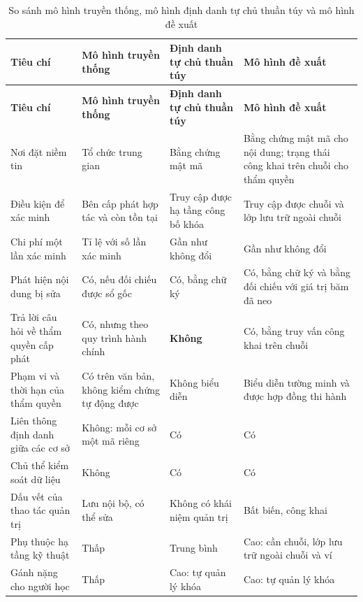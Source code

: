 \begin{longtable}{|p{3.1cm}|p{3.5cm}|p{3.5cm}|p{3.5cm}|}
\caption{So sánh mô hình truyền thống, mô hình định danh tự chủ thuần túy và mô hình đề xuất}
\label{tab:traditional-ssi-comparison} \\

\hline
\textbf{Tiêu chí} & \textbf{Mô hình truyền thống} & \textbf{Định danh tự chủ thuần túy} & \textbf{Mô hình đề xuất} \\
\hline
\endfirsthead

\hline
\textbf{Tiêu chí} & \textbf{Mô hình truyền thống} & \textbf{Định danh tự chủ thuần túy} & \textbf{Mô hình đề xuất} \\
\hline
\endhead

\hline
\endfoot

\hline
\endlastfoot

Nơi đặt niềm tin
& Tổ chức trung gian
& Bằng chứng mật mã
& Bằng chứng mật mã cho nội dung; trạng thái công khai trên chuỗi cho thẩm quyền
\\ \hline

Điều kiện để xác minh
& Bên cấp phát hợp tác và còn tồn tại
& Truy cập được hạ tầng công bố khóa
& Truy cập được chuỗi và lớp lưu trữ ngoài chuỗi
\\ \hline

Chi phí một lần xác minh
& Tỉ lệ với số lần xác minh
& Gần như không đổi
& Gần như không đổi
\\ \hline

Phát hiện nội dung bị sửa
& Có, nếu đối chiếu được sổ gốc
& Có, bằng chữ ký
& Có, bằng chữ ký và bằng đối chiếu với giá trị băm đã neo
\\ \hline

Trả lời câu hỏi về thẩm quyền cấp phát
& Có, nhưng theo quy trình hành chính
& \textbf{Không}
& Có, bằng truy vấn công khai trên chuỗi
\\ \hline

Phạm vi và thời hạn của thẩm quyền
& Có trên văn bản, không kiểm chứng tự động được
& Không biểu diễn
& Biểu diễn tường minh và được hợp đồng thi hành
\\ \hline

Liên thông định danh giữa các cơ sở
& Không: mỗi cơ sở một mã riêng
& Có
& Có
\\ \hline

Chủ thể kiểm soát dữ liệu
& Không
& Có
& Có
\\ \hline

Dấu vết của thao tác quản trị
& Lưu nội bộ, có thể sửa
& Không có khái niệm quản trị
& Bất biến, công khai
\\ \hline

Phụ thuộc hạ tầng kỹ thuật
& Thấp
& Trung bình
& Cao: cần chuỗi, lớp lưu trữ ngoài chuỗi và ví
\\ \hline

Gánh nặng cho người học
& Thấp
& Cao: tự quản lý khóa
& Cao: tự quản lý khóa
\\ \hline

\end{longtable}
